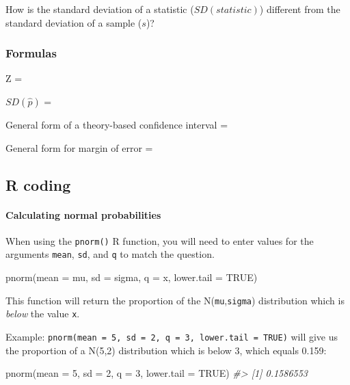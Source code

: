 \documentclass[
]{report}
\newenvironment{Shaded}{\begin{snugshade}}{\end{snugshade}}
\newcommand{\AttributeTok}[1]{\textcolor[rgb]{0.77,0.63,0.00}{#1}}
\newcommand{\CommentTok}[1]{\textcolor[rgb]{0.56,0.35,0.01}{\textit{#1}}}
\newcommand{\ConstantTok}[1]{\textcolor[rgb]{0.00,0.00,0.00}{#1}}
\newcommand{\DecValTok}[1]{\textcolor[rgb]{0.00,0.00,0.81}{#1}}
\newcommand{\FunctionTok}[1]{\textcolor[rgb]{0.00,0.00,0.00}{#1}}
\newcommand{\NormalTok}[1]{#1}
\newcommand{\rgs}{\vspace{12pt}} %
\begin{document}
How is the standard deviation of a statistic (\(SD(statistic)\)) different from the standard deviation of a sample (\(s\))?
\rgs

\hypertarget{formulas}{%
\subsubsection*{Formulas}\label{formulas}}

Z =
\rgs

\(SD(\hat{p})\) =
\rgs

General form of a theory-based confidence interval =
\rgs

General form for margin of error =
\rgs

\hypertarget{r-coding}{%
\subsection*{R coding}\label{r-coding}}

\hypertarget{calculating-normal-probabilities}{%
\paragraph*{Calculating normal probabilities}\label{calculating-normal-probabilities}}

When using the \texttt{pnorm()} R function, you will need to enter values for the arguments \texttt{mean}, \texttt{sd}, and \texttt{q} to match the question.

\begin{Shaded}
\begin{Highlighting}[]
\FunctionTok{pnorm}\NormalTok{(}\AttributeTok{mean =}\NormalTok{ mu, }\AttributeTok{sd =}\NormalTok{ sigma, }\AttributeTok{q =}\NormalTok{ x, }\AttributeTok{lower.tail =} \ConstantTok{TRUE}\NormalTok{)}
\end{Highlighting}
\end{Shaded}

This function will return the proportion of the N(\texttt{mu},\texttt{sigma}) distribution which is \emph{below} the value \texttt{x}.

Example: \texttt{pnorm(mean\ =\ 5,\ sd\ =\ 2,\ q\ =\ 3,\ lower.tail\ =\ TRUE)} will give us the proportion of a N(5,2) distribution which is below 3, which equals 0.159:

\begin{Shaded}
\begin{Highlighting}[]
\FunctionTok{pnorm}\NormalTok{(}\AttributeTok{mean =} \DecValTok{5}\NormalTok{, }\AttributeTok{sd =} \DecValTok{2}\NormalTok{, }\AttributeTok{q =} \DecValTok{3}\NormalTok{, }\AttributeTok{lower.tail =} \ConstantTok{TRUE}\NormalTok{)}
\CommentTok{\#\textgreater{} [1] 0.1586553}
\end{Highlighting}
\end{Shaded}
\end{document}
